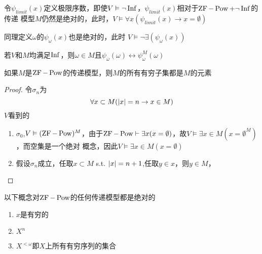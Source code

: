 \documentclass[11pt]{article}
\begin{document}
\begin{remark}
令\(\psi_{limit}(x)\)定义极限序数，即使\(V\vDash\neg\operatorname{Inf}\)，\(\psi_{limit}(x)\)相对于\(\operatorname{ZF}-\operatorname{Pow}+\neg\operatorname{Inf}\)的传递
模型\(M\)仍然是绝对的，此时，\(V\vDash\forall x(\psi_{limit}(x)\to x=\emptyset)\)

同理定义\(\omega\)的\(\psi_\omega(x)\)也是绝对的，此时
\(V\vDash\neg\exists(\psi_\omega(x))\)

若\(V\)和\(M\)均满足\(\operatorname{Inf}\)，则\(\omega\in M\)且\(\psi_\omega(\omega)\leftrightarrow\psi_\omega^M(\omega)\)
\end{remark}

\begin{lemma}[]
如果\(M\)是\(\operatorname{ZF}-\operatorname{Pow}\)的传递模型，则\(M\)的所有有穷子集都是\(M\)的元素
\end{lemma}

\begin{proof}
令\(\sigma_n\)为
\begin{equation*}
\forall x\subset M(\abs{x}=n\to x\in M)
\end{equation*}
\(V\)看到的
\begin{enumerate}
\item \(\sigma_0\),\(V\vDash(\operatorname{ZF}-\operatorname{Pow})^{M}\)，由于\(\operatorname{ZF}-\operatorname{Pow}\vdash\exists x(x=\emptyset)\)，故\(V\vDash\exists x\in M(x=\emptyset^M)\)，而空集是一个绝对
概念，因此\(V\vDash\exists x\in M(x=\emptyset)\)
\item 假设\(\sigma_n\)成立，任取\(x\subset M\) s.t. \(\abs{x}=n+1\),任取\(y\in x\)，则\(y\in M\)，
\end{enumerate}
\end{proof}

\begin{theorem}[]
以下概念对\(\operatorname{ZF}-\operatorname{Pow}\)的任何传递模型都是绝对的
\begin{enumerate}
\item \(x\)是有穷的
\item \(X^n\)
\item \(X^{<\omega}\)即\(X\)上所有有穷序列的集合
\end{enumerate}
\end{theorem}
\end{document}
